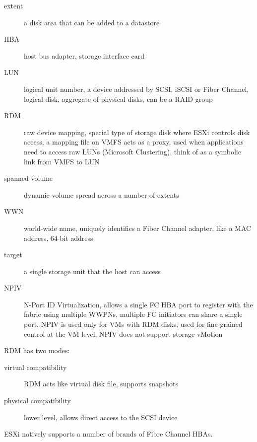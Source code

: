 \begin{description}

  \item[extent] a disk area that can be added to a datastore

  \item[HBA] host bus adapter, storage interface card

  \item [LUN] logical unit number, a device addressed by SCSI, iSCSI or Fiber
    Channel, logical disk, aggregate of physical disks, can be a RAID group

  \item[RDM] raw device mapping, special type of storage disk where ESXi
    controls disk access, a mapping file on VMFS acts as a proxy, used when
    applications need to access raw LUNs (Microsoft Clustering), think of
    as a symbolic link from VMFS to LUN

  \item[spanned volume]
    dynamic volume spread across a number of extents

  \item[WWN] world-wide name, uniquely identifies a Fiber Channel adapter,
    like a MAC address, 64-bit address

  \item[target] a single storage unit that the host can access

  \item[NPIV]
    N-Port ID Virtualization, allows a single FC HBA port to register with the
    fabric using multiple WWPNs, multiple FC initiators can share a single port,
    NPIV is used only for VMs with RDM disks, used for fine-grained control
    at the VM level, NPIV does not support storage vMotion

\end{description}

RDM has two modes:

\begin{description}

\item[virtual compatibility]
RDM acts like virtual disk file, supports snapshots

\item[physical compatibility]
lower level, allows direct access to the SCSI device

\end{description}

ESXi natively supports a number of brands of Fibre Channel HBAs.

